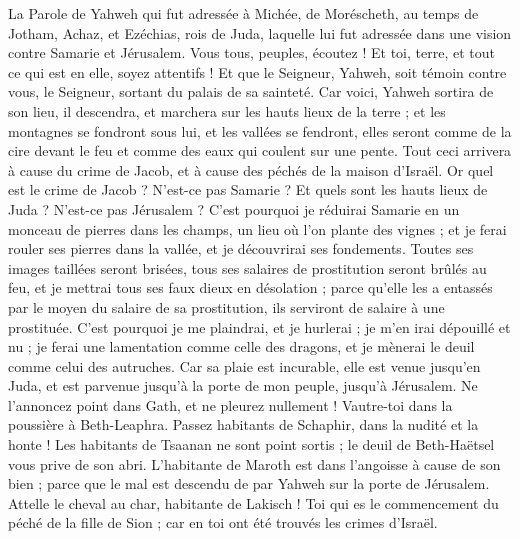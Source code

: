 \begin{multicols}{2}
\VerseOne{}La Parole de Yahweh qui fut adressée à Michée, de Moréscheth, au temps de Jotham, Achaz, et Ezéchias, rois de Juda, laquelle lui fut adressée dans une vision contre Samarie et Jérusalem.
Vous tous, peuples, écoutez ! Et toi, terre, et tout ce qui est en elle, soyez attentifs ! Et que le Seigneur, Yahweh, soit témoin contre vous, le Seigneur, sortant du palais de sa sainteté.
Car voici, Yahweh sortira de son lieu, il descendra, et marchera sur les hauts lieux de la terre ;
et les montagnes se fondront sous lui, et les vallées se fendront, elles seront comme de la cire devant le feu et comme des eaux qui coulent sur une pente.
Tout ceci arrivera à cause du crime de Jacob, et à cause des péchés de la maison d'Israël. Or quel est le crime de Jacob ? N'est-ce pas Samarie ? Et quels sont les hauts lieux de Juda ? N'est-ce pas Jérusalem ?
C'est pourquoi je réduirai Samarie en un monceau de pierres dans les champs, un lieu où l'on plante des vignes ; et je ferai rouler ses pierres dans la vallée, et je découvrirai ses fondements.
Toutes ses images taillées seront brisées, tous ses salaires de prostitution seront brûlés au feu, et je mettrai tous ses faux dieux en désolation ; parce qu'elle les a entassés par le moyen du salaire de sa prostitution, ils serviront de salaire à une prostituée.
C'est pourquoi je me plaindrai, et je hurlerai ; je m'en irai dépouillé et nu ; je ferai une lamentation comme celle des dragons, et je mènerai le deuil comme celui des autruches.
Car sa plaie est incurable, elle est venue jusqu'en Juda, et est parvenue jusqu'à la porte de mon peuple, jusqu'à Jérusalem.
Ne l'annoncez point dans Gath, et ne pleurez nullement ! Vautre-toi dans la poussière à Beth-Leaphra.
Passez habitants de Schaphir, dans la nudité et la honte ! Les habitants de Tsaanan ne sont point sortis ; le deuil de Beth-Haëtsel vous prive de son abri.
L’habitante de Maroth est dans l'angoisse à cause de son bien ; parce que le mal est descendu de par Yahweh sur la porte de Jérusalem.
Attelle le cheval au char, habitante de Lakisch ! Toi qui es le commencement du péché de la fille de Sion ; car en toi ont été trouvés les crimes d'Israël.

\end{multicols}
